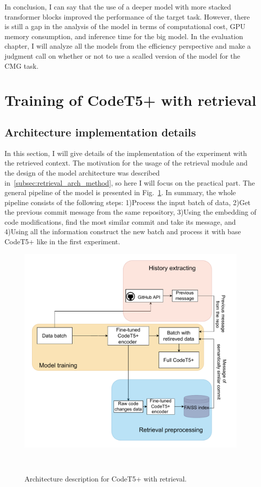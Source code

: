In conclusion, I can say that the use of a deeper model with more stacked transformer blocks improved the performance of the target task. However, there is still a gap in the analysis of the model in terms of computational cost, GPU memory consumption, and inference time for the big model. In the evaluation chapter, I will analyze all the models from the efficiency perspective and make a judgment call on whether or not to use a scalled version of the model for the CMG task. 

\section{Training of CodeT5+ with retrieval}
\subsection{Architecture implementation details}
In this section, I will give details of the implementation of the experiment with the retrieved context. The motivation for the usage of the retrieval module and the design of the model architecture was described in~\ref{subsec:retrieval_arch_method}, so here I will focus on the practical part. The general pipeline of the model is presented in Fig.~\ref{fig:retrieval_pipeline}. In summary, the whole pipeline consists of the following steps: 1)Process the input batch of data, 2)Get the previous commit message from the same repository, 3)Using the embedding of code modifications, find the most similar commit and take its message, and 4)Using all the information construct the new batch and process it with base CodeT5+ like in the first experiment.
\begin{figure}[H]
    \centering
    \includegraphics[scale=0.75]{figs/retrieval_arch.drawio.pdf}
    \caption{Architecture description for CodeT5+ with retrieval.}
    ~\label{fig:retrieval_pipeline}
\end{figure}
